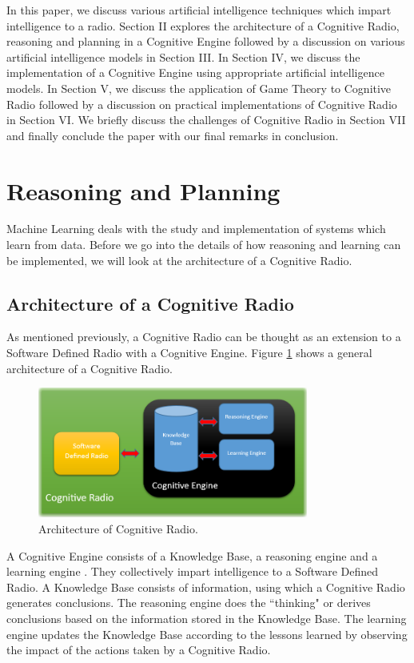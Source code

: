 \documentclass[conference]{IEEEtran}
\begin{document}
    In this paper, we discuss various artificial intelligence techniques which impart intelligence to a radio. Section II explores the architecture of a Cognitive Radio, reasoning and planning in a Cognitive Engine followed by a discussion on various artificial intelligence models in Section III. In Section IV, we discuss the implementation of a Cognitive Engine using appropriate artificial intelligence models. In Section V, we discuss the application of Game Theory to Cognitive Radio followed by a discussion on practical implementations of Cognitive Radio in Section VI. We briefly discuss the challenges of Cognitive Radio in Section VII and finally conclude the paper with our final remarks in conclusion.

\section{Reasoning and Planning}

Machine Learning deals with the study and implementation of systems which learn from data. Before we go into the details of how reasoning and learning can be implemented, we will look at the architecture of a Cognitive Radio.

\subsection{Architecture of a Cognitive Radio}
As mentioned previously, a Cognitive Radio can be thought as an extension to a Software Defined Radio with a Cognitive Engine. Figure \ref{fig_arch} shows a general architecture of a Cognitive Radio.


\begin{figure}[!t]
\centering
\includegraphics[width=3.5in]{Figure_1}
\caption{Architecture of Cognitive Radio.}
\label{fig_arch}
\end{figure}

	A Cognitive Engine consists of a Knowledge Base, a reasoning engine and a learning engine \cite{4}. They collectively impart intelligence to a Software Defined Radio. A Knowledge Base consists of information, using which a Cognitive Radio generates conclusions. The reasoning engine does the ``thinking" or derives conclusions based on the information stored in the Knowledge Base. The learning engine updates the Knowledge Base according to the lessons learned by observing the impact of the actions taken by a Cognitive Radio.
\end{document}
